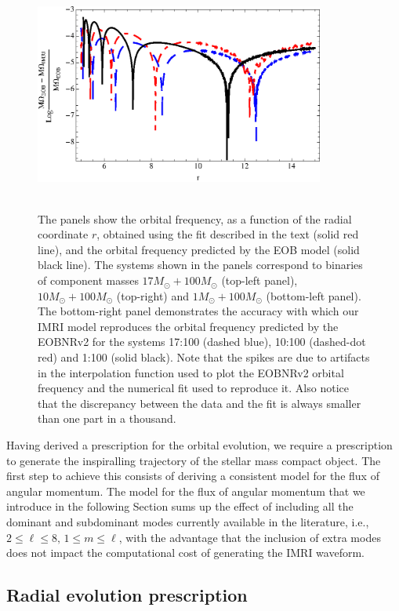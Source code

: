 \begin{figure}[ht]
{\includegraphics[height=2.73in, width=3.75in,  clip]{figures/insimri/omac}
}
\caption{The panels show the orbital frequency, as a function of the radial coordinate \(r\),  obtained using the fit described in the text (solid red line), and the orbital frequency predicted by the EOB model (solid black line). The systems shown in the panels correspond to binaries of component masses \(17 M_{\odot}+100M_{\odot}\) (top-left panel), \(10 M_{\odot}+100M_{\odot}\) (top-right) and  \(1 M_{\odot}+100M_{\odot}\) (bottom-left panel). The bottom-right panel demonstrates the accuracy with which our IMRI model reproduces the orbital frequency predicted by the EOBNRv2 for the systems 17:100 (dashed blue), 10:100 (dashed-dot red) and 1:100 (solid black). Note that the spikes are due to artifacts in the interpolation function used to plot the EOBNRv2 orbital frequency and the numerical fit used to reproduce it. Also notice that the discrepancy between the data and the fit is always smaller than one part in a thousand. }
\label{omegafit}
\end{figure}

Having derived a prescription for the orbital evolution, we require a prescription to generate the inspiralling trajectory of the stellar mass compact object. The first step to achieve this consists of deriving a consistent model for the flux of angular momentum. The model for the flux of angular momentum that we introduce in the following Section sums up the effect of including all the dominant and subdominant modes currently available in the literature, i.e., \(2\leq \ell \leq 8, \, 1\leq m \leq \ell\), with the advantage that the inclusion of extra modes does not impact the computational cost of generating the IMRI waveform. 


\subsection{Radial evolution prescription}

